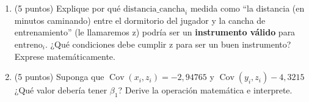 \documentclass[10pt,a4paper]{article}
\begin{document}
\begin{enumerate}
\begin{enumerate}
    \item (5 puntos) Explique por qué $\text{distancia\_cancha}_i$ medida como ``la distancia (en minutos caminando) entre el dormitorio del jugador y la cancha de entrenamiento'' (le llamaremos z) podría ser un \textbf{instrumento válido} para $\text{entreno}_i$. ¿Qué condiciones debe cumplir z para ser un buen instrumento? Exprese matemáticamente.\\

    \item (5 puntos) Suponga que $\operatorname{Cov}(x_i, z_i) = -2,94765$ y $\operatorname{Cov}(y_i, z_i) -4,3215$ ¿Qué valor debería tener $\beta_1$? Derive la operación matemática e interprete.\\

\end{enumerate}
\end{enumerate}
\end{document}

